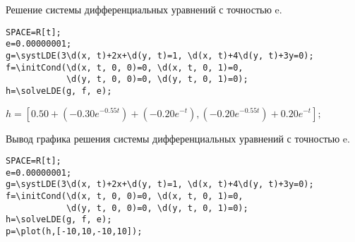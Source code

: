 Решение системы дифференциальных уравнений с точностью e.

\begin{verbatim}
SPACE=R[t];
e=0.00000001;
g=\systLDE(3\d(x, t)+2x+\d(y, t)=1, \d(x, t)+4\d(y, t)+3y=0);
f=\initCond(\d(x, t, 0, 0)=0, \d(x, t, 0, 1)=0, 
            \d(y, t, 0, 0)=0, \d(y, t, 0, 1)=0);
h=\solveLDE(g, f, e);  
\end{verbatim}

{$h = [0. 50+(-0. 30 e^{-0. 55t})+(-0. 20 e^{-t}), (-0. 20 e^{-0. 55t})+0. 20 e^{-t}];$}

Вывод графика решения системы дифференциальных уравнений с точностью e.

\begin{verbatim}
SPACE=R[t];
e=0.00000001;
g=\systLDE(3\d(x, t)+2x+\d(y, t)=1, \d(x, t)+4\d(y, t)+3y=0);
f=\initCond(\d(x, t, 0, 0)=0, \d(x, t, 0, 1)=0, 
            \d(y, t, 0, 0)=0, \d(y, t, 0, 1)=0);
h=\solveLDE(g, f, e); 
p=\plot(h,[-10,10,-10,10]); 
\end{verbatim}

